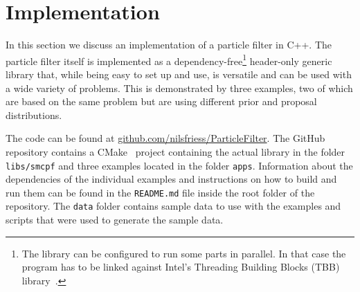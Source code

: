 \section*{Implementation}
In this section we discuss an implementation of a particle filter in
C++. The particle filter itself is implemented as a
dependency-free\footnote{The library can be configured to run some
  parts in parallel. In that case the program has to be linked against
  Intel's Threading Building Blocks (TBB) library~\cite{intel}.}
header-only generic library that, while being easy to set up and use,
is versatile and can be used with a wide variety of problems. This is
demonstrated by three examples, two of which are based on the same
problem but are using different prior and proposal distributions.

The code can be found at
\url{github.com/nilsfriess/ParticleFilter}. The GitHub repository
contains a CMake~\cite{cmake} project containing the actual library in
the folder \texttt{libs/smcpf} and three examples located in the
folder \texttt{apps}. Information about the dependencies of the
individual examples and instructions on how to build and run them can
be found in the \texttt{README.md} file inside the root folder of the
repository. The \texttt{data} folder contains sample data to use with
the examples and scripts that were used to generate the sample data.

